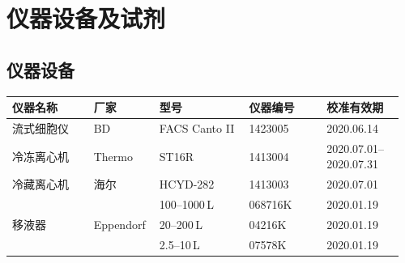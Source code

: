 \documentclass[UTF8,10pt,a4paper,fontset=fandol]{ctexart}
\newcommand{\fieldvalue}[1]{#1}
\newcommand{\handwritten}[1]{#1}
\begin{document}
\section{仪器设备及试剂}

\subsection{仪器设备}

\begin{tabular}{|p{0.20\linewidth}|p{0.16\linewidth}|p{0.22\linewidth}|p{0.19\linewidth}|p{0.19\linewidth}|}
\hline
仪器名称 & 厂家 & 型号 & 仪器编号 & 校准有效期 \\
\hline
流式细胞仪 & BD & FACS Canto II &
\fieldvalue{\handwritten{1423005}} &
\fieldvalue{\handwritten{2020.06.14}} \\
\hline
冷冻离心机 & Thermo & ST16R &
\fieldvalue{\handwritten{1413004}} &
\fieldvalue{\handwritten{2020.07.01--2020.07.31}} \\
\hline
冷藏离心机 & 海尔 & HCYD-282 &
\fieldvalue{\handwritten{1413003}} &
\fieldvalue{\handwritten{2020.07.01}} \\
\hline
\multirow{3}{*}{移液器} & \multirow{3}{*}{Eppendorf} &
\fieldvalue{\handwritten{100--1000\,\textmu L}} &
\fieldvalue{\handwritten{068716K}} &
\fieldvalue{\handwritten{2020.01.19}} \\
\cline{3-5}
& &
\fieldvalue{\handwritten{20--200\,\textmu L}} &
\fieldvalue{\handwritten{04216K}} &
\fieldvalue{\handwritten{2020.01.19}} \\
\cline{3-5}
& &
\fieldvalue{\handwritten{2.5--10\,\textmu L}} &
\fieldvalue{\handwritten{07578K}} &
\fieldvalue{\handwritten{2020.01.19}} \\
\hline
\end{tabular}
\end{document}
